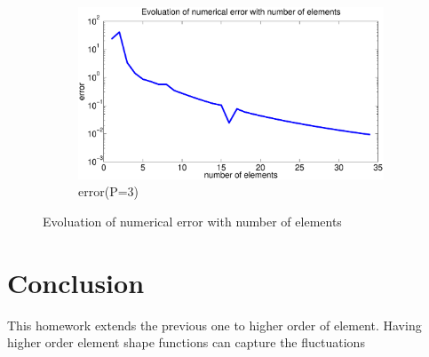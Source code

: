 \documentclass[paper=a4, fontsize=11pt]{article} %
\begin{document}
\begin{figure}
        \begin{subfigure}[b]{0.8\textwidth}
                \includegraphics[width=\textwidth]{error_P3.eps}
                \caption{error(P=3)}
                \label{fig:e3}
        \end{subfigure}

        \caption{Evoluation of numerical error with number of elements}\label{fig:error}
\end{figure}




\section{Conclusion}

This homework extends the previous one to higher order of element. Having higher order element shape functions can capture the fluctuations 
\end{document}
